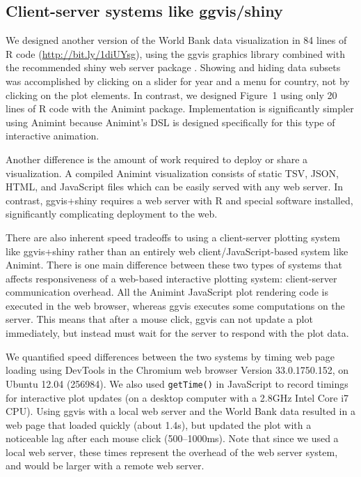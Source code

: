 \documentclass[10pt,journal,compsoc]{IEEEtran}\usepackage[]{graphicx}\usepackage[]{color}
\begin{document}
\subsection{Client-server systems like ggvis/shiny}

We designed another version of the World Bank data visualization in 84
lines of R code (\url{http://bit.ly/1diUYsg}), using the ggvis
graphics library combined with the recommended shiny web server
package \citep{shiny, ggvis}. Showing and hiding data subsets was
accomplished by clicking on a slider for year and a menu for country,
not by clicking on the plot elements. In contrast, we designed
Figure~1 using only 20 lines of R code with the Animint package. 
Implementation is significantly simpler using Animint
because Animint's DSL is designed specifically for this type of
interactive animation.

Another difference is the amount of work required to deploy or share a
visualization. A compiled Animint visualization consists of static
TSV, JSON, HTML, and JavaScript files which can be easily served with
any web server. In contrast, ggvis+shiny requires a web server with R
and special software installed, significantly complicating
deployment to the web.

There are also inherent speed tradeoffs to using a client-server
plotting system like ggvis+shiny rather than an entirely web
client/JavaScript-based system like Animint. There is one main
difference between these two types of systems that affects
responsiveness of a web-based interactive plotting system:
client-server communication overhead. All the \mbox{Animint}
JavaScript plot rendering code is executed in the web browser, whereas
ggvis executes some computations on the server. This means that after
a mouse click, ggvis can not update a plot immediately, but instead
must wait for the server to respond with the plot data.

We quantified speed differences between the two systems by timing web
page loading using DevTools in the Chromium web browser Version
33.0.1750.152, on Ubuntu 12.04 (256984). We also used \texttt{getTime()}
in JavaScript to record timings for interactive plot updates (on a
desktop computer with a 2.8GHz Intel Core i7 CPU). Using ggvis with a
local web server and the World Bank data resulted in a web page that
loaded quickly (about 1.4s), but updated the plot with a noticeable
lag after each mouse click (500--1000ms). Note that since we used a
local web server, these times represent the overhead of the web server
system, and would be larger with a remote web server.
\end{document}
